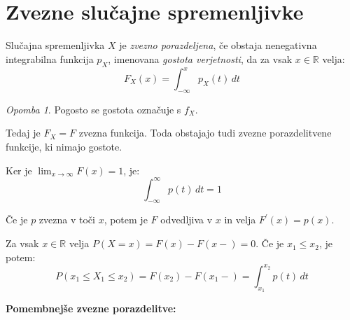 \documentclass[12pt]{book}
\def\n{\noindent}
\theoremstyle{definition}
\theoremstyle{plain}
\theoremstyle{plain}
\theoremstyle{plain}
\theoremstyle{remark}
\newtheorem*{opomba}{Opomba}
\begin{document}
\section{Zvezne slučajne spremenljivke}

Slučajna spremenljivka $X$ je \emph{zvezno porazdeljena}, če obstaja nenegativna integrabilna funkcija $p_X$, imenovana \emph{gostota verjetnosti}, da za vsak $x \in \mathbb{R}$ velja:
$$
F_X(x)=\int_{-\infty}^x p_X(t) \, d t
$$

\begin{opomba}
    Pogosto se gostota označuje s $f_X$.   
\end{opomba}
  
\n Tedaj je $F_X=F$ zvezna funkcija. Toda obstajajo tudi zvezne porazdelitvene funkcije, ki nimajo gostote.

\n Ker je $\lim _{x \rightarrow \infty} F(x)=1$, je: 
$$
\int_{-\infty}^{\infty} p(t) \, d t=1
$$ 

\n Če je $p$ zvezna v toči $x$, potem je $F$ odvedljiva v $x$ in velja $F^{\prime}(x)=p(x)$. 

\n Za vsak $x \in \mathbb{R}$ velja $P(X=x)=F(x)-F(x-)=0$. Če je $x_1 \leq x_2$, je potem:
$$
P\left(x_1 \leq X_1 \leq x_2\right)=F\left(x_2\right)-F\left(x_1-\right)=\int_{x_1}^{x_2} p(t) \, d t
$$

\n \textbf{Pomembnejše zvezne porazdelitve:}
\end{document}
